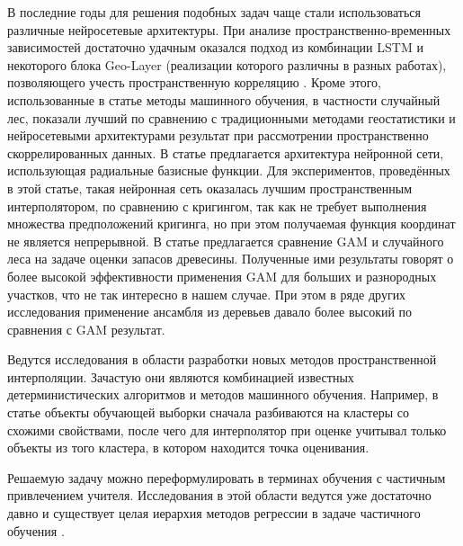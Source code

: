 \documentclass{article}
\begin{document}
В последние годы для решения подобных задач чаще стали использоваться различные нейросетевые архитектуры. При анализе пространственно-временных зависимостей достаточно удачным оказался подход из комбинации LSTM и некоторого блока Geo-Layer (реализации которого различны в разных работах), позволяющего учесть пространственную корреляцию \citep{sanchez2019growing, MA2019117729, maack2016modelling}. Кроме этого, использованные в статье \cite{MA2019117729} методы машинного обучения, в частности случайный лес, показали лучший по сравнению с традиционными методами геостатистики и нейросетевыми архитектурами результат при рассмотрении пространственно скоррелированных данных. В статье \citep{LIU2011568} предлагается архитектура нейронной сети, использующая радиальные базисные функции. Для экспериментов, проведённых в этой статье, такая нейронная сеть оказалась лучшим пространственным интерполятором, по сравнению с кригингом, так как не требует выполнения множества предположений кригинга, но при этом получаемая функция координат не является непрерывной. В статье \cite{maack2016modelling} предлагается сравнение GAM и случайного леса на задаче оценки запасов древесины. Полученные ими результаты говорят о более высокой эффективности применения GAM для больших и разнородных участков, что не так интересно в нашем случае. При этом в ряде других исследования применение ансамбля из деревьев давало более высокий по сравнения с GAM результат.

Ведутся исследования в области разработки новых методов пространственной интерполяции. Зачастую они являются комбинацией известных детерминистических алгоритмов и методов машинного обучения. Например, в статье \cite{kataev2013classification} объекты обучающей выборки сначала разбиваются на кластеры со схожими свойствами, после чего для интерполятор при оценке учитывал только объекты из того кластера, в котором находится точка оценивания.

Решаемую задачу можно переформулировать в терминах обучения с частичным привлечением учителя. Исследования в этой области ведутся уже достаточно давно и существует целая иерархия методов регрессии в задаче частичного обучения \citep{Kostopoulos2018, Xu2021SSR}. 





\end{document}
